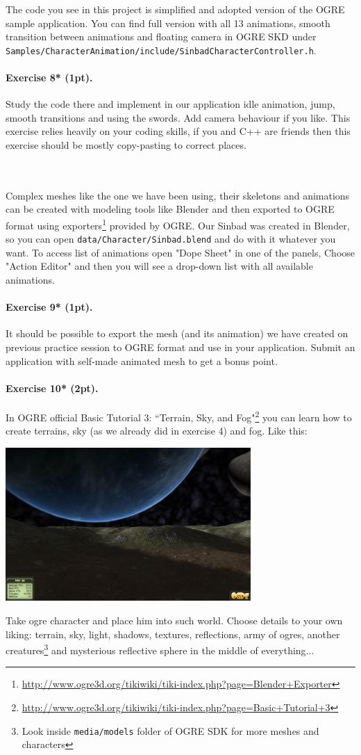 \documentclass{article}
\newenvironment{exercise}[2]{\paragraph{Exercise #1 (#2pt).} }{
\medskip}
\begin{document}
The code you see in this project is simplified and adopted version of the OGRE sample application. You can find full version with all 13 animations, smooth transition between animations and floating camera in OGRE SKD under \verb#Samples/CharacterAnimation/include/SinbadCharacterController.h#.
\begin{exercise}{8*}{1}
Study the code there and implement in our application idle animation, jump, smooth transitions and using the swords. Add camera behaviour if you like. This exercise relies heavily on your coding skills, if you and C++ are friends then this exercise should be mostly copy-pasting to correct places.
\end{exercise}

\ \\
\ \\

Complex meshes like the one we have been using, their skeletons and animations can be created with modeling tools like Blender and then exported to OGRE format using exporters\footnote{\url{http://www.ogre3d.org/tikiwiki/tiki-index.php?page=Blender+Exporter}} provided by OGRE. Our Sinbad was created in Blender, so you can open \verb#data/Character/Sinbad.blend# and do with it whatever you want. To access list of animations open "Dope Sheet" in one of the panels, Choose "Action Editor" and then you will see a drop-down list with all available animations.

\begin{exercise}{9*}{1}
It should be possible to export the mesh (and its animation) we have created on previous practice session to OGRE format and use in your application. Submit an application with self-made animated mesh to get a bonus point.
\end{exercise}

\begin{exercise}{10*}{2}
In OGRE official Basic Tutorial 3: ``Terrain, Sky, and Fog"\footnote{\url{http://www.ogre3d.org/tikiwiki/tiki-index.php?page=Basic+Tutorial+3}} you can learn how to create terrains, sky (as we already did in exercise 4) and fog. Like this:
\begin{center}
\includegraphics[width=0.7\textwidth]{terrain.jpg}
\end{center}
Take ogre character and place him into such world. Choose details to your own liking: terrain, sky, light, shadows, textures, reflections, army of ogres, another creatures\footnote{Look inside \texttt{media/models} folder of OGRE SDK for more meshes and characters} and mysterious reflective sphere in the middle of everything...
\end{exercise}
\end{document}
